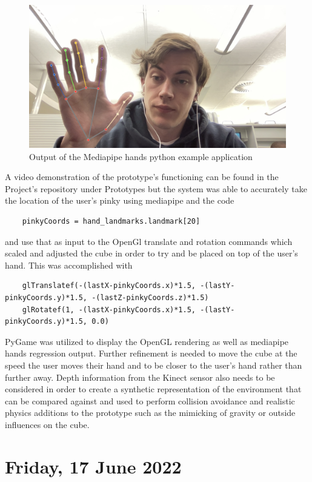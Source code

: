 \begin{figure}[h]
    \centering
    \includegraphics[width=0.6\linewidth]{figures/python_mediapipe_hands.png}
    \caption{Output of the Mediapipe hands python example application}
    \label{fig:python_mediapipe_hands}
\end{figure}

A video demonstration of the prototype's functioning can be found in the Project's repository under Prototypes but the system was able to accurately take the location of the user's pinky using mediapipe and the code

\begin{lstlisting}
    pinkyCoords = hand_landmarks.landmark[20]
  \end{lstlisting}

and use that as input to the OpenGl translate and rotation commands which scaled and adjusted the cube in order to try and be placed on top of the user's hand. This was accomplished with 

\begin{lstlisting}
    glTranslatef(-(lastX-pinkyCoords.x)*1.5, -(lastY-pinkyCoords.y)*1.5, -(lastZ-pinkyCoords.z)*1.5)
    glRotatef(1, -(lastX-pinkyCoords.x)*1.5, -(lastY-pinkyCoords.y)*1.5, 0.0)
  \end{lstlisting}

PyGame was utilized to display the OpenGL rendering as well as mediapipe hands regression output. Further refinement is needed to move the cube at the speed the user moves their hand and to be closer to the user's hand rather than further away. Depth information from the Kinect sensor also needs to be considered in order to create a synthetic representation of the environment that can be compared against and used to perform collision avoidance and realistic physics additions to the prototype such as the mimicking of gravity or outside influences on the cube.

\section[2022/06/17]{Friday, 17 June 2022}


